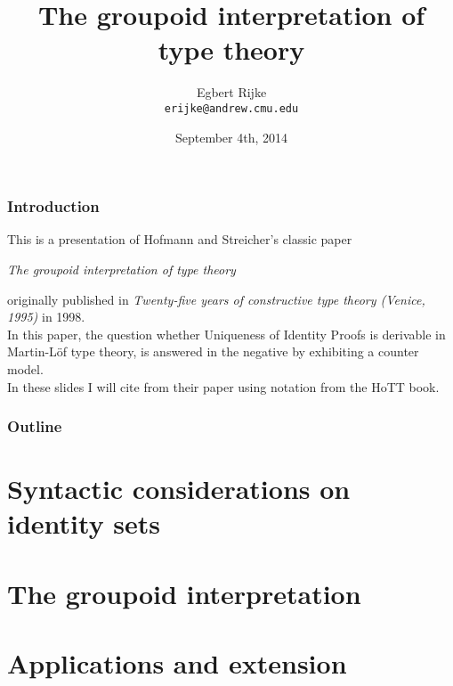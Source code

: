 \documentclass{beamer}
\title{The groupoid interpretation of type theory}
\author[Egbert]{Egbert Rijke \\ \texttt{erijke@andrew.cmu.edu}}
\date{September 4th, 2014}
\institute{Carnegie Mellon University}
\begin{document}
\begin{frame}
  \titlepage
\end{frame}

\begin{frame}
  \frametitle{Introduction}
  This is a presentation of Hofmann and Streicher's classic paper
  \begin{center}
  \emph{The groupoid interpretation of type theory}
  \end{center}
  originally published in
  \emph{Twenty-five years of constructive type theory (Venice, 1995)}
  in 1998.
  \\
  \vspace{\baselineskip}
  In this paper, the question whether Uniqueness of Identity Proofs is derivable
  in Martin-L\"of type theory, is answered in the negative by exhibiting a
  counter model.
  \\
  \vspace{\baselineskip}
  In these slides I will cite from their paper using notation from the
  HoTT book.
\end{frame}

\begin{frame}
  \frametitle{Outline}
  \tableofcontents[pausesections]
\end{frame}

\section{Syntactic considerations on identity sets}

\section{The groupoid interpretation}

\section{Applications and extension}
\end{document}
